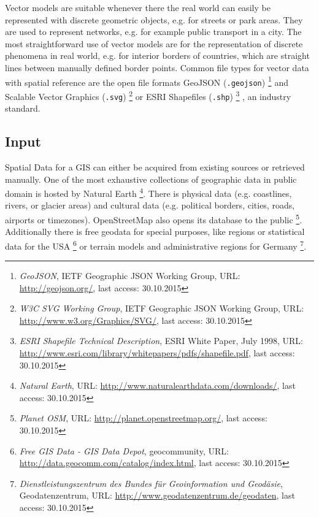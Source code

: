 Vector models are suitable whenever there the real world can easily be represented with discrete geometric objects, e.g. for streets or park areas. They are used to represent networks, e.g. for example public transport in a city. The most straightforward use of vector models are for the representation of discrete phenomena in real world, e.g. for interior borders of countries, which are straight lines between manually defined border points. Common file types for vector data with spatial reference are the open file formats GeoJSON (\texttt{.geojson})
\footnote{
  \textit{GeoJSON},
  IETF Geographic JSON Working Group,
  URL: \url{http://geojson.org/},
  last access: 30.10.2015
}
and Scalable Vector Graphics (\texttt{.svg})
\footnote{
  \textit{W3C SVG Working Group},
  IETF Geographic JSON Working Group,
  URL: \url{http://www.w3.org/Graphics/SVG/},
  last access: 30.10.2015
}
or ESRI Shapefiles (\texttt{.shp})
\footnote{
  \textit{ESRI Shapefile Technical Description},
  ESRI White Paper, July 1998,
  URL: \url{http://www.esri.com/library/whitepapers/pdfs/shapefile.pdf},
  last access: 30.10.2015
}
, an industry standard.




\subsection{Input} %
\label{ssub:input}

Spatial Data for a GIS can either be acquired from existing sources or retrieved manually. One of the most exhaustive collections of geographic data in public domain is hosted by Natural Earth
\footnote{
  \textit{Natural Earth},
  URL: \url{http://www.naturalearthdata.com/downloads/},
  last access: 30.10.2015
}.
There is physical data (e.g. coastlines, rivers, or glacier areas) and cultural data (e.g. political borders, cities, roads, airports or timezones). OpenStreetMap also opens its database to the public
\footnote{
  \textit{Planet OSM},
  URL: \url{http://planet.openstreetmap.org/},
  last access: 30.10.2015
}.
Additionally there is free geodata for special purposes, like regions or statistical data for the USA
\footnote{
  \textit{Free GIS Data - GIS Data Depot},
  geocommunity,
  URL: \url{http://data.geocomm.com/catalog/index.html},
  last access: 30.10.2015
}
or terrain models and administrative regions for Germany
\footnote{
  \textit{Dienstleistungszentrum des Bundes für Geoinformation und Geodäsie},
  Geodatenzentrum,
  URL: \url{http://www.geodatenzentrum.de/geodaten},
  last access: 30.10.2015
}.


